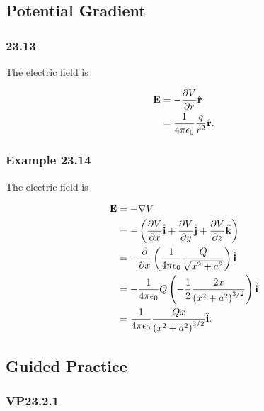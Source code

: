 \documentclass{article}
\begin{document}
\subsection{Potential Gradient}

\subsubsection{23.13}

The electric field is

\begin{align*}
  \mathbf{E} & = -\frac{\partial V}{\partial r} \hat{\mathbf{r}} \\
             & = \frac{1}{4 \pi \epsilon_0} \frac{q}{r^2} \hat{\mathbf{r}}.
\end{align*}

\subsubsection{Example 23.14}

The electric field is

\begin{align*}
  \mathbf{E} & = -\nabla V                                                                                                                                                        \\
             & = -\left( \frac{\partial V}{\partial x} \hat{\mathbf{i}} + \frac{\partial V}{\partial y} \hat{\mathbf{j}} + \frac{\partial V}{\partial z} \hat{\mathbf{k}} \right) \\
             & = -\frac{\partial}{\partial x} \left( \frac{1}{4 \pi \epsilon_0} \frac{Q}{\sqrt{x^2 + a^2}} \right) \hat{\mathbf{i}}                                                                      \\
             & = -\frac{1}{4 \pi \epsilon_0} Q \left( -\frac{1}{2} \frac{2 x}{\left( x^2 + a^2 \right)^{3/2}} \right) \hat{\mathbf{i}}                                                                   \\
             & = \frac{1}{4 \pi \epsilon_0} \frac{Q x}{\left( x^2 + a^2 \right)^{3/2}} \hat{\mathbf{i}}.
\end{align*}

\subsection{Guided Practice}

\subsubsection{VP23.2.1}
\end{document}
